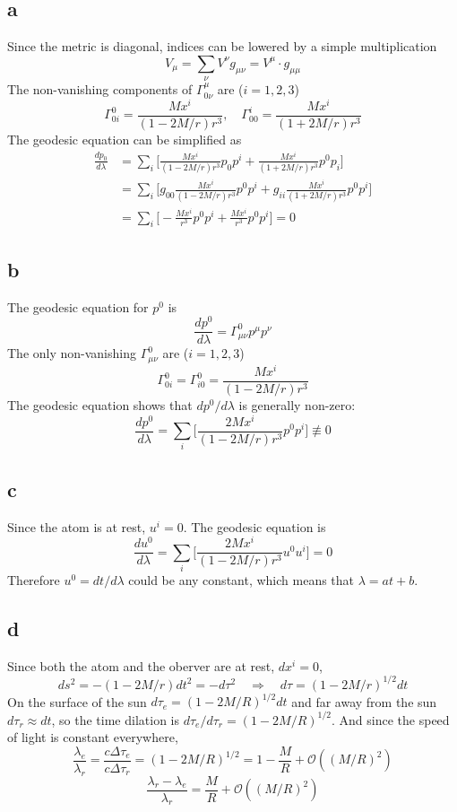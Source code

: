 \documentclass{article}
\begin{document}
\subsection*{a}
Since the metric is diagonal, indices can be lowered by a simple multiplication
\[ V_\mu = \sum_\nu V^\nu g_{\mu\nu} = V^\mu \cdot g_{\mu\mu}\]
The non-vanishing components of $\Gamma^{\mu}_{0\nu}$ are ($i = 1,2,3$)
\[ \Gamma^{0}_{0i} = \frac{Mx^i}{(1-2M/r)r^3}, \quad \Gamma^{i}_{00} = \frac{Mx^i}{(1+2M/r)r^3} \]
The geodesic equation can be simplified as
\begin{align*}
\frac{dp_0}{d\lambda} &= \sum_i \Big[ \frac{Mx^i}{(1-2M/r)r^3}p_0 p^i + \frac{Mx^i}{(1+2M/r)r^3}p^0 p_i \Big]\\
&= \sum_i \Big[ g_{00}\frac{Mx^i}{(1-2M/r)r^3}p^0 p^i + g_{ii}\frac{Mx^i}{(1+2M/r)r^3}p^0 p^i \Big]\\
&= \sum_i \Big[ -\frac{Mx^i}{r^3}p^0 p^i + \frac{Mx^i}{r^3}p^0 p^i \Big] = 0
\end{align*}
\subsection*{b}
The geodesic equation for $p^0$ is
\[ \frac{dp^0}{d\lambda} = \Gamma^0_{\mu\nu}p^\mu p^\nu \]
The only non-vanishing $\Gamma^0_{\mu\nu}$ are ($i = 1,2,3$)
\[ \Gamma^{0}_{0i} = \Gamma^{0}_{i0} = \frac{Mx^i}{(1-2M/r)r^3} \]
The geodesic equation shows that $dp^0/d\lambda$ is generally non-zero:
\[ \frac{dp^0}{d\lambda} = \sum_i \Big[ \frac{2Mx^i}{(1-2M/r)r^3}p^0 p^i \Big] \not\equiv 0\]
\subsection*{c}
Since the atom is at rest, $u^i = 0$. The geodesic equation is
\[ \frac{du^0}{d\lambda} = \sum_i \Big[ \frac{2Mx^i}{(1-2M/r)r^3}u^0 u^i \Big] = 0\]
Therefore $u^0 = dt/d\lambda$ could be any constant, which means that $\lambda = at + b$.
\subsection*{d}
Since both the atom and the oberver are at rest, $dx^i = 0$,
\[ ds^2 = -(1-2M/r)dt^2 = -d\tau^2 \quad\Rightarrow\quad d\tau  = (1-2M/r)^{1/2}dt\]
On the surface of the sun $d\tau_e  = (1-2M/R)^{1/2}dt$ and far away from the sun $d\tau_r \approx dt$, so the time dilation is $d\tau_e / d\tau_r = (1-2M/R)^{1/2}$. And since the speed of light is constant everywhere, 
\[ \frac{\lambda_e}{\lambda_r} = \frac{c\Delta\tau_e}{c\Delta\tau_r} = (1-2M/R)^{1/2} = 1 - \frac{M}{R} + \mathcal{O}\left((M/R)^2\right)\]
\[ \frac{\lambda_r - \lambda_e}{\lambda_r} = \frac{M}{R} + \mathcal{O}\left((M/R)^2\right) \]
\end{document}

